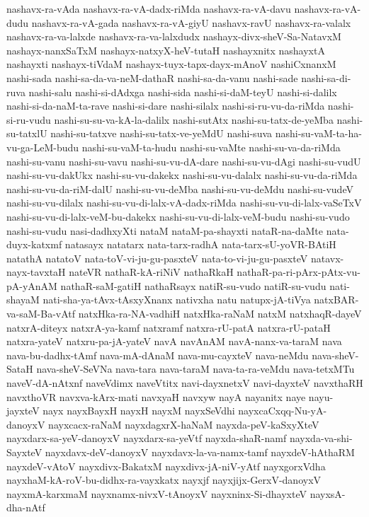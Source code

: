 {nashavx-ra-vAda
nashavx-ra-vA-dadx-riMda
nashavx-ra-vA-davu
nashavx-ra-vA-dudu
nashavx-ra-vA-gada
nashavx-ra-vA-giyU
nashavx-ravU
nashavx-ra-valalx
nashavx-ra-va-lalxde
nashavx-ra-va-lalxdudx
nashayx-divx-sheV-Sa-NatavxM
nashayx-nanxSaTxM
nashayx-natxyX-heV-tutaH
nashayxnitx
nashayxtA
nashayxti
nashayx-tiVdaM
nashayx-tuyx-tapx-dayx-mAnoV
nashiCxnanxM
nashi-sada
nashi-sa-da-va-neM-dathaR
nashi-sa-da-vanu
nashi-sade
nashi-sa-di-ruva
nashi-salu
nashi-si-dAdxga
nashi-sida
nashi-si-daM-teyU
nashi-si-dalilx
nashi-si-da-naM-ta-rave
nashi-si-dare
nashi-silalx
nashi-si-ru-vu-da-riMda
nashi-si-ru-vudu
nashi-su-su-va-kA-la-dalilx
nashi-sutAtx
nashi-su-tatx-de-yeMba
nashi-su-tatxlU
nashi-su-tatxve
nashi-su-tatx-ve-yeMdU
nashi-suva
nashi-su-vaM-ta-ha-vu-ga-LeM-budu
nashi-su-vaM-ta-hudu
nashi-su-vaMte
nashi-su-va-da-riMda
nashi-su-vanu
nashi-su-vavu
nashi-su-vu-dA-dare
nashi-su-vu-dAgi
nashi-su-vudU
nashi-su-vu-dakUkx
nashi-su-vu-dakekx
nashi-su-vu-dalalx
nashi-su-vu-da-riMda
nashi-su-vu-da-riM-dalU
nashi-su-vu-deMba
nashi-su-vu-deMdu
nashi-su-vudeV
nashi-su-vu-dilalx
nashi-su-vu-di-lalx-vA-dadx-riMda
nashi-su-vu-di-lalx-vaSeTxV
nashi-su-vu-di-lalx-veM-bu-dakekx
nashi-su-vu-di-lalx-veM-budu
nashi-su-vudo
nashi-su-vudu
nasi-dadhxyXti
nataM
nataM-pa-shayxti
nataR-na-daMte
nata-duyx-katxmf
natasayx
natatarx
nata-tarx-radhA
nata-tarx-sU-yoVR-BAtiH
natathA
natatoV
nata-toV-vi-ju-gu-pasxteV
nata-to-vi-ju-gu-pasxteV
natavx-nayx-tavxtaH
nateVR
nathaR-kA-riNiV
nathaRkaH
nathaR-pa-ri-pArx-pAtx-vu-pA-yAnAM
nathaR-saM-gatiH
nathaRsayx
natiR-su-vudo
natiR-su-vudu
nati-shayaM
nati-sha-ya-tAvx-tAsxyXnanx
nativxha
natu
natupx-jA-tiVya
natxBAR-va-saM-Ba-vAtf
natxHka-ra-NA-vadhiH
natxHka-raNaM
natxM
natxhaqR-dayeV
natxrA-diteyx
natxrA-ya-kamf
natxramf
natxra-rU-patA
natxra-rU-pataH
natxra-yateV
natxru-pa-jA-yateV
navA
navAnAM
navA-nanx-va-taraM
nava
nava-bu-dadhx-tAmf
nava-mA-dAnaM
nava-mu-cayxteV
nava-neMdu
nava-sheV-SataH
nava-sheV-SeVNa
nava-tara
nava-taraM
nava-ta-ra-veMdu
nava-tetxMTu
naveV-dA-nAtxnf
naveVdimx
naveVtitx
navi-dayxnetxV
navi-dayxteV
navxthaRH
navxthoVR
navxva-kArx-mati
navxyaH
navxyw
nayA
nayanitx
naye
nayu-jayxteV
nayx
nayxBayxH
nayxH
nayxM
nayxSeVdhi
nayxcaCxqq-Nu-yA-danoyxV
nayxcacx-raNaM
nayxdagxrX-haNaM
nayxda-peV-kaSxyXteV
nayxdarx-sa-yeV-danoyxV
nayxdarx-sa-yeVtf
nayxda-shaR-namf
nayxda-va-shi-SayxteV
nayxdavx-deV-danoyxV
nayxdavx-la-va-namx-tamf
nayxdeV-hAthaRM
nayxdeV-vAtoV
nayxdivx-BakatxM
nayxdivx-jA-niV-yAtf
nayxgorxVdha
nayxhaM-kA-roV-bu-didhx-ra-vayxkatx
nayxjf
nayxjijx-GerxV-danoyxV
nayxmA-karxmaM
nayxnamx-nivxV-tAnoyxV
nayxninx-Si-dhayxteV
nayxsA-dha-nAtf
}
